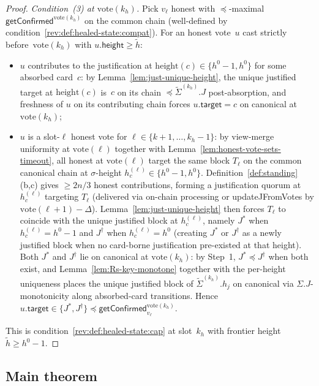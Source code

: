 \documentclass{article}
\newcommand{\target}{\mathsf{target}}
\newcommand{\height}{\mathsf{height}}
\newcommand{\updateJFromVotes}{\textsf{updateJFromVotes}\xspace}
\newcommand{\vote}{\ensuremath{\mathrm{vote}}}
\newcommand{\comm}[1]{\ensuremath{\widetilde{#1}}}
\newcommand{\getConfirmed}{\textsf{getConfirmed}\xspace}
\theoremstyle{plain}
\theoremstyle{definition}
\theoremstyle{remark}
\begin{document}
\begin{proof}
\emph{Condition~(3) at $\vote(k_h)$.}
Pick $v_\ell$ honest with $\preceq$-maximal $\getConfirmed^{\vote(k_h)}$ on the common chain (well-defined by condition~\ref{rev:def:healed-state:compat}).
For an honest vote~$u$ cast strictly before~$\vote(k_h)$ with $u.\height \geq \comm{h}$:
\begin{itemize}
  \item $u$ contributes to the justification at $\mathrm{height}(c) \in \{h^0 - 1, h^0\}$ for some absorbed card~$c$: by Lemma~\ref{lem:just-unique-height}, the unique justified target at $\mathrm{height}(c)$ is~$c$ on its chain $\preceq \comm{\Sigma}^{(k_h)}.J$ post-absorption, and freshness of $u$ on its contributing chain forces $u.\target = c$ on canonical at $\vote(k_h)$;
  \item $u$ is a slot-$\ell$ honest vote for $\ell \in \{k+1, \ldots, k_h - 1\}$: by view-merge uniformity at $\vote(\ell)$ together with Lemma~\ref{lem:honest-vote-sets-timeout}, all honest at $\vote(\ell)$ target the same block $T_\ell$ on the common canonical chain at $\sigma$-height $h_c^{(\ell)} \in \{h^0 - 1, h^0\}$.
  Definition~\ref{def:standing}(b,c) gives $\geq 2n/3$ honest contributions, forming a justification quorum at $h_c^{(\ell)}$ targeting $T_\ell$ (delivered via on-chain processing or \updateJFromVotes{} by $\vote(\ell+1) - \Delta$).
  Lemma~\ref{lem:just-unique-height} then forces $T_\ell$ to coincide with the unique justified block at $h_c^{(\ell)}$, namely $J^*$ when $h_c^{(\ell)} = h^0 - 1$ and $J^\dagger$ when $h_c^{(\ell)} = h^0$ (creating $J^*$ or $J^\dagger$ as a newly justified block when no card-borne justification pre-existed at that height).
  Both $J^*$ and $J^\dagger$ lie on canonical at $\vote(k_h)$: by Step~1, $J^* \preceq J^\dagger$ when both exist, and Lemma~\ref{lem:Rs-key-monotone} together with the per-height uniqueness places the unique justified block of $\comm{\Sigma}^{(k_h)}.h_j$ on canonical via $\Sigma.J$-monotonicity along absorbed-card transitions.
  Hence $u.\target \in \{J^*, J^\dagger\} \preceq \getConfirmed_{v_\ell}^{\vote(k_h)}$.
\end{itemize}
This is condition~\ref{rev:def:healed-state:cap} at slot~$k_h$ with frontier height $\comm{h} \geq h^0 - 1$.
\end{proof}

\subsection{Main theorem}\label{sec:healing-main}
\end{document}

